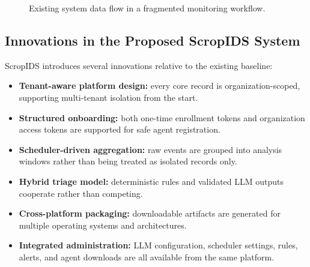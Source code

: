 \documentclass[12pt,a4paper]{article}
\begin{document}
\begin{figure}[H]
\centering
{}
\caption{Existing system data flow in a fragmented monitoring workflow.}
\label{fig:existing-dfd}
\end{figure}

\subsection{Innovations in the Proposed ScropIDS System}
ScropIDS introduces several innovations relative to the existing baseline:

\begin{itemize}
    \item \textbf{Tenant-aware platform design:} every core record is organization-scoped, supporting multi-tenant isolation from the start.
    \item \textbf{Structured onboarding:} both one-time enrollment tokens and organization access tokens are supported for safe agent registration.
    \item \textbf{Scheduler-driven aggregation:} raw events are grouped into analysis windows rather than being treated as isolated records only.
    \item \textbf{Hybrid triage model:} deterministic rules and validated LLM outputs cooperate rather than competing.
    \item \textbf{Cross-platform packaging:} downloadable artifacts are generated for multiple operating systems and architectures.
    \item \textbf{Integrated administration:} LLM configuration, scheduler settings, rules, alerts, and agent downloads are all available from the same platform.
\end{itemize}
\end{document}
